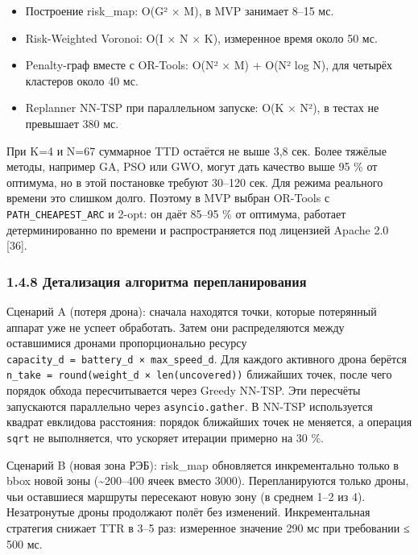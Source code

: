\documentclass[14pt,a4paper]{extarticle}
\begin{document}
\begin{itemize}
\item Построение risk\_map: O(G² × M), в MVP занимает 8--15 мс.
\item Risk-Weighted Voronoi: O(I × N × K), измеренное время около 50 мс.
\item Penalty-граф вместе с OR-Tools: O(N² × M) + O(N² log N), для четырёх кластеров около 40 мс.
\item Replanner NN-TSP при параллельном запуске: O(K × N²), в тестах не превышает 380 мс.
\end{itemize}


При K=4 и N=67 суммарное TTD остаётся не выше 3,8 сек. Более тяжёлые методы, например GA, PSO или GWO, могут дать качество выше 95 \% от оптимума, но в этой постановке требуют 30--120 сек. Для режима реального времени это слишком долго. Поэтому в MVP выбран OR-Tools с \texttt{PATH\_CHEAPEST\_ARC} и 2-opt: он даёт 85--95 \% от оптимума, работает детерминированно по времени и распространяется под лицензией Apache 2.0 {[}36{]}.

\hypertarget{ux434ux435ux442ux430ux43bux438ux437ux430ux446ux438ux44f-ux430ux43bux433ux43eux440ux438ux442ux43cux430-ux43fux435ux440ux435ux43fux43bux430ux43dux438ux440ux43eux432ux430ux43dux438ux44f}{%
\subsubsection{1.4.8 Детализация алгоритма перепланирования}\label{ux434ux435ux442ux430ux43bux438ux437ux430ux446ux438ux44f-ux430ux43bux433ux43eux440ux438ux442ux43cux430-ux43fux435ux440ux435ux43fux43bux430ux43dux438ux440ux43eux432ux430ux43dux438ux44f}}

Сценарий A (потеря дрона): сначала находятся точки, которые потерянный аппарат уже не успеет обработать. Затем они распределяются между оставшимися дронами пропорционально ресурсу \texttt{capacity\_d\ =\ battery\_d\ ×\ max\_speed\_d}. Для каждого активного дрона берётся \texttt{n\_take\ =\ round(weight\_d\ ×\ len(uncovered))} ближайших точек, после чего порядок обхода пересчитывается через Greedy NN-TSP. Эти пересчёты запускаются параллельно через \texttt{asyncio.gather}. В NN-TSP используется квадрат евклидова расстояния: порядок ближайших точек не меняется, а операция \texttt{sqrt} не выполняется, что ускоряет итерации примерно на 30 \%.

Сценарий B (новая зона РЭБ): risk\_map обновляется инкрементально только в bbox новой зоны (\textasciitilde200--400 ячеек вместо 3000). Перепланируются только дроны, чьи оставшиеся маршруты пересекают новую зону (в среднем 1--2 из 4). Незатронутые дроны продолжают полёт без изменений. Инкрементальная стратегия снижает TTR в 3--5 раз: измеренное значение 290 мс при требовании ≤ 500 мс.
\end{document}
